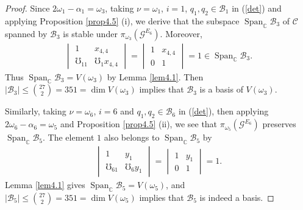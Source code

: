 \documentclass[12pt]{article}
\numberwithin{equation}{section}
\theoremstyle{definition}
\theoremstyle{remark}
\begin{document}
\begin{proof}
 	Since $2\omega_1-\alpha_1=\omega_3$, taking $\nu=\omega_1$, $i=1$, $q_1,q_2\in\mathcal{B}_1$ in (\ref{det}) and applying Proposition \ref{prop4.5} (i), we derive that the subspace $\operatorname{Span}_{\mathbb{C}}\mathcal{B}_3$ of $\mathscr{C}$ spanned by $\mathcal{B}_3$ is stable under $\pi_{\omega_3}(\mathscr{G}^{E_6})$. Moreover, 
 	\begin{eqnarray}
 		\begin{vmatrix}
 			1&x_{4,4}\\\mho_11&\mho_1x_{4,4}
 		\end{vmatrix}=\begin{vmatrix}
 		1&x_{4,4}\\0&1
 		\end{vmatrix}=1\in\operatorname{Span}_{\mathbb{C}}\mathcal{B}_3.
 	\end{eqnarray}
 	Thus $\operatorname{Span}_{\mathbb{C}}\mathcal{B}_3=V(\omega_3)$ by Lemma \ref{lem4.1}. Then $|\mathcal B_3|\leqslant \binom{27}{2}=351=\dim V(\omega_3)$ implies that $\mathcal{B}_3$ is a basis of $V(\omega_3)$.
 	
 	Similarly, taking $\nu=\omega_6$, $i=6$ and $q_1,q_2\in\mathcal{B}_6$ in (\ref{det}), then applying $2\omega_6-\alpha_6=\omega_5$ and Proposition \ref{prop4.5} (ii), we see that $\pi_{\omega_5}(\mathscr{G}^{E_6})$ preserves $\operatorname{Span}_{\mathbb{C}}\mathcal{B}_5$. The element $1$ also belongs to $\operatorname{Span}_{\mathbb{C}}\mathcal{B}_5$ by
 	\begin{eqnarray}
 		\begin{vmatrix}
 			1&y_1\\\mho_61&\mho_6y_1
 		\end{vmatrix}=\begin{vmatrix}
 			1&y_1\\0&1
 		\end{vmatrix}=1.
 	\end{eqnarray}
 	Lemma \ref{lem4.1} gives $\operatorname{Span}_{\mathbb{C}}\mathcal{B}_5=V(\omega_5)$, and $|\mathcal B_5|\leqslant \binom{27}{2}=351=\dim V(\omega_5)$ implies that $\mathcal{B}_5$ is indeed a basis.
 	

\end{proof}
\end{document}
